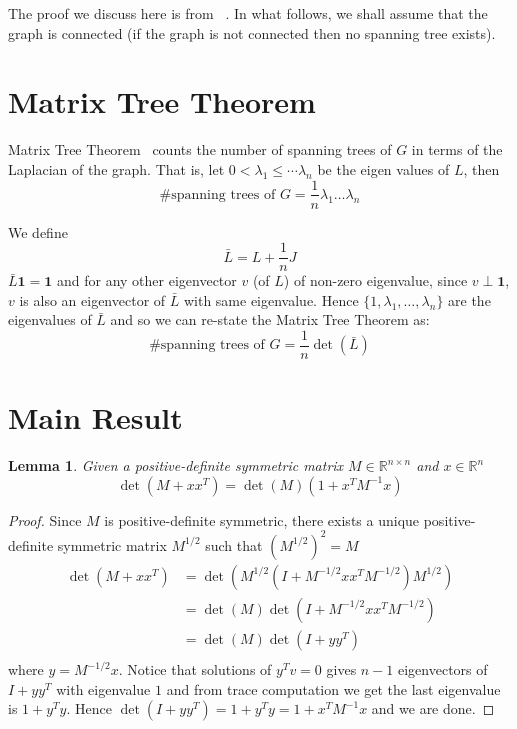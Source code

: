 \documentclass[10pt]{article}
\theoremstyle{plain}
\newtheorem{lemma}[theorem]{Lemma}
\begin{document}
The proof we discuss here is from ~\cite{appralgo}. In what follows, we shall assume that the graph is connected (if the graph is not connected then no spanning tree exists).

\section{Matrix Tree Theorem}

Matrix Tree Theorem~\cite{godsil2001algebraic} counts the number of spanning trees of $G$ in terms of the Laplacian of the graph. That is, let $0 < \lambda_1 \leq \cdots \lambda_n$ be the eigen values of $L$, then 
$$\# \text{spanning trees of } G = \frac1n \lambda_1 \ldots \lambda_n$$

We define $$\bar{L} = L + \frac1n J$$
$\bar{L} \textbf{1} = \textbf{1}$ and for any other eigenvector $v$ (of $L$) of non-zero eigenvalue, since $v \perp \textbf{1}$, $v$ is also an eigenvector of $\bar{L}$ with same eigenvalue. Hence $\{1, \lambda_1, \ldots, \lambda_n\}$ are the eigenvalues of $\bar{L}$ and so we can re-state the Matrix Tree Theorem as:
$$\# \text{spanning trees of } G = \frac1n \det(\bar{L})$$

\section{Main Result}

\begin{lemma}
Given a positive-definite symmetric matrix $M \in \mathbb{R}^{n \times n}$ and $x \in \mathbb{R}^n$
$$\det(M + x x^T) = \det(M) (1 + x^T M^{-1} x)$$
\end{lemma}

\begin{proof}
Since $M$ is positive-definite symmetric, there exists a unique positive-definite symmetric matrix $M^{1/2}$ such that $(M^{1/2})^2 = M$
\begin{align*}
    \det(M + x x^T) &= \det \left(M^{1/2} (I + M^{-1/2} x x^T M^{-1/2}) M^{1/2} \right) \\
    &= \det(M) \det(I + M^{-1/2} x x^T M^{-1/2}) \\
    &= \det(M) \det(I + yy^T) \\
\end{align*}
where $y = M^{-1/2} x$. Notice that solutions of $y^Tv = 0$ gives $n-1$ eigenvectors of $I + yy^T$ with eigenvalue $1$ and from trace computation we get the last eigenvalue is $1 + y^Ty$. Hence $\det(I + yy^T) = 1 + y^Ty = 1 + x^T M^{-1} x$ and we are done.
\end{proof}
\end{document}
